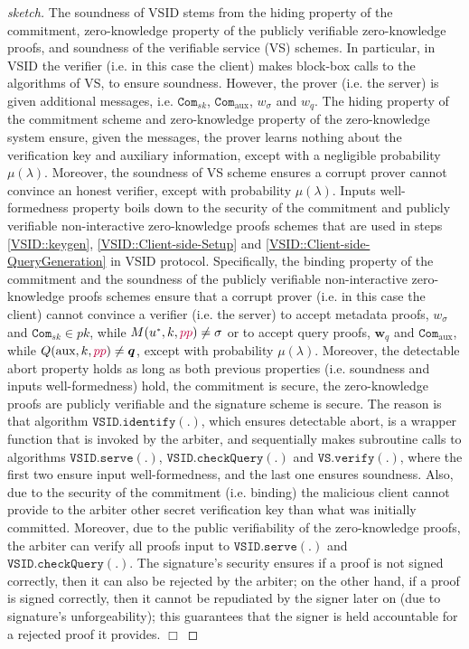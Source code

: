 
\begin{proof}[sketch] The soundness  of VSID  stems  from the hiding property of the commitment, zero-knowledge property of the publicly verifiable zero-knowledge proofs, and soundness of  the  verifiable service (VS) schemes. In particular, in VSID the verifier (i.e. in this case the client) makes block-box calls to the algorithms of   VS, to ensure soundness. However, the prover (i.e.  the server) is given  additional messages, i.e.   $\mathtt{Com}_{\scriptscriptstyle sk}$,  $\mathtt{Com}_{\scriptscriptstyle \text{aux}}$, $w_{\scriptscriptstyle\sigma}$ and $w_{\scriptscriptstyle q}$. The hiding property of the commitment scheme and zero-knowledge property of the zero-knowledge system ensure, given the messages, the prover learns nothing about the verification key and auxiliary information, except with a negligible probability $\mu(\lambda)$. Moreover, the soundness of VS scheme ensures a corrupt prover cannot convince an honest verifier, except with  probability $\mu(\lambda)$.   Inputs well-formedness property boils down to the security of the commitment and publicly verifiable non-interactive zero-knowledge proofs   schemes that are used in steps \ref{VSID::keygen}, \ref{VSID::Client-side-Setup} and \ref{VSID::Client-side-QueryGeneration} in VSID protocol. Specifically,  the binding property of the commitment and the soundness of the publicly verifiable non-interactive zero-knowledge proofs schemes  ensure that a corrupt prover (i.e. in this case the client) cannot convince a verifier (i.e. the server) to accept metadata proofs, $w_{\scriptscriptstyle\sigma}$ and $\mathtt{Com}_{\scriptscriptstyle sk}\in pk$, while  $M(u^{\scriptscriptstyle *},k,{\color{purple}pp})\neq \sigma $ or to accept query proofs, $\bm{w}_{\scriptscriptstyle q}$ and $\mathtt{Com}_{\scriptscriptstyle \text{aux}}$, while $Q(\text{aux},k,{\color{purple}pp})\neq \bm{q}$, except with  probability $\mu(\lambda)$.  Moreover, the detectable abort property holds as long as both previous properties (i.e. soundness and inputs well-formedness) hold, the commitment is secure, the zero-knowledge proofs are publicly verifiable and the signature scheme is secure. The reason is that algorithm $\mathtt{VSID.identify}(.)$, which ensures detectable abort, is a wrapper function that is invoked by the arbiter, and  sequentially makes subroutine calls to algorithms  $\mathtt{VSID.serve}(.)$,  $\mathtt{VSID.checkQuery}(.)$ and $\mathtt{VS.verify}(.)$,   where the first two ensure input well-formedness, and the last one ensures soundness. Also, due to the security of the commitment (i.e. binding) the malicious client cannot provide to the arbiter other secret verification key than what  was initially committed. Moreover, due to the public verifiability of the zero-knowledge proofs, the arbiter can verify all proofs input to $\mathtt{VSID.serve}(.)$ and $\mathtt{VSID.checkQuery}(.)$. The signature's security ensures if a proof is not signed correctly, then it can also be rejected by the arbiter; on the other hand, if a proof is signed correctly, then  it cannot be repudiated by the signer later on (due to signature's unforgeability); this guarantees that the signer is held accountable for a rejected proof it provides.
  \hfill\(\Box\)\end{proof}
  
  
  
  
  
  